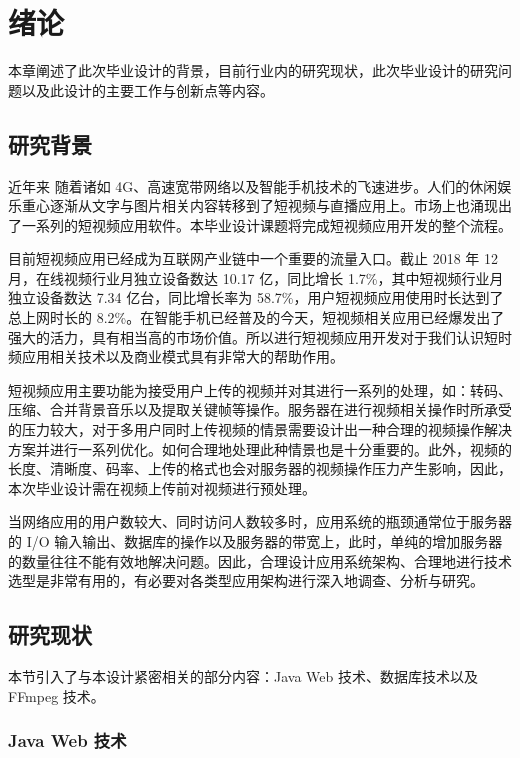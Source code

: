 \chapter{绪论}\label{sec:introduction}

本章阐述了此次毕业设计的背景，目前行业内的研究现状，此次毕业设计的研究问题以及此设计的主要工作与创新点等内容。

\section{研究背景}

近年来 随着诸如 4G、高速宽带网络以及智能手机技术的飞速进步。人们的休闲娱乐重心逐渐从文字与图片相关内容转移到了短视频与直播应用上。市场上也涌现出了一系列的短视频应用软件。本毕业设计课题将完成短视频应用开发的整个流程。

目前短视频应用已经成为互联网产业链中一个重要的流量入口。截止 2018 年 12 月，在线视频行业月独立设备数达 10.17 亿，同比增长 1.7\%，其中短视频行业月独立设备数达 7.34 亿台，同比增长率为 58.7\%，用户短视频应用使用时长达到了总上网时长的 8.2\%\cite{中国互联网络信息中心2018第}。在智能手机已经普及的今天，短视频相关应用已经爆发出了强大的活力，具有相当高的市场价值。所以进行短视频应用开发对于我们认识短时频应用相关技术以及商业模式具有非常大的帮助作用。

短视频应用主要功能为接受用户上传的视频并对其进行一系列的处理，如：转码、压缩、合并背景音乐以及提取关键帧等操作。服务器在进行视频相关操作时所承受的压力较大，对于多用户同时上传视频的情景需要设计出一种合理的视频操作解决方案并进行一系列优化。如何合理地处理此种情景也是十分重要的。此外，视频的长度、清晰度、码率、上传的格式也会对服务器的视频操作压力产生影响，因此，本次毕业设计需在视频上传前对视频进行预处理。

当网络应用的用户数较大、同时访问人数较多时，应用系统的瓶颈通常位于服务器的 I/O 输入输出、数据库的操作以及服务器的带宽上，此时，单纯的增加服务器的数量往往不能有效地解决问题。因此，合理设计应用系统架构、合理地进行技术选型是非常有用的，有必要对各类型应用架构进行深入地调查、分析与研究。

\section{研究现状}
本节引入了与本设计紧密相关的部分内容：Java Web 技术、数据库技术以及 FFmpeg 技术。

\subsection{Java Web 技术}

